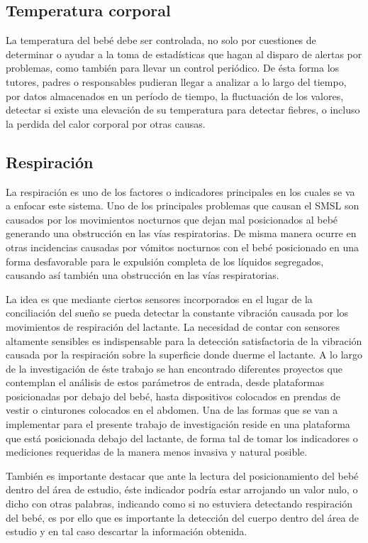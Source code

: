 \documentclass{IEEEtran}
\begin{document}
		\subsection{Temperatura corporal}

			La temperatura del bebé debe ser controlada, no solo por cuestiones de determinar o ayudar a la toma de estadísticas que hagan al disparo de alertas por problemas, como también para llevar un control periódico. De ésta forma los tutores, padres o responsables pudieran llegar a analizar a lo largo del tiempo, por datos almacenados en un período de tiempo, la fluctuación de los valores, detectar si existe una elevación de su temperatura para detectar fiebres, o incluso la perdida del calor corporal por otras causas.

		\subsection{Respiración}

			La respiración es uno de los factores o indicadores principales en los cuales se va a enfocar este sistema. Uno de los principales problemas que causan el SMSL son causados por los movimientos nocturnos que dejan mal posicionados al bebé generando una obstrucción en las vías respiratorias. De misma manera ocurre en otras incidencias causadas por vómitos nocturnos con el bebé posicionado en una forma desfavorable para le expulsión completa de los líquidos segregados, causando así también una obstrucción en las vías respiratorias.

			La idea es que mediante ciertos sensores incorporados en el lugar de la conciliación del sueño se pueda detectar la constante vibración causada por los movimientos de respiración del lactante. La necesidad de contar con sensores altamente sensibles es indispensable para la detección satisfactoria de la vibración causada por la respiración sobre la superficie donde duerme el lactante. A lo largo de la investigación de éste trabajo se han encontrado diferentes proyectos que contemplan el análisis de estos parámetros de entrada, desde plataformas posicionadas por debajo del bebé, hasta dispositivos colocados en prendas de vestir o cinturones colocados en el abdomen. Una de las formas que se van a implementar para el presente trabajo de investigación reside en una plataforma que está posicionada debajo del lactante, de forma tal de tomar los indicadores o mediciones requeridas de la manera menos invasiva y natural posible.

			También es importante destacar que ante la lectura del posicionamiento del bebé dentro del área de estudio, éste indicador podría estar arrojando un valor nulo, o dicho con otras palabras, indicando como si no estuviera detectando respiración del bebé, es por ello que es importante la detección del cuerpo dentro del área de estudio y en tal caso descartar la información obtenida.
	
\end{document}
